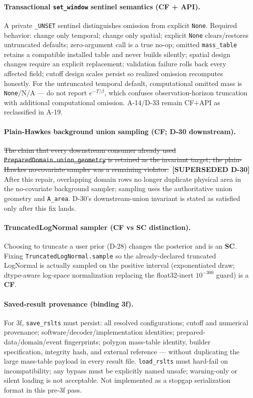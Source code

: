 \documentclass[
  10pt,
]{article}
\newcommand{\amdstrike}[1]{\sout{#1}}
\newcommand{\amdstrike}[1]{\textcolor{supcolor}{#1}}
\newcommand{\supsd}[2]{{\color{supcolor}\amdstrike{#2}}~{\color{amdcolor}\footnotesize\textbf{[SUPERSEDED #1]}}}
\begin{document}
\paragraph{Transactional \texttt{set\_window} sentinel semantics (CF + API).}
A private \texttt{\_UNSET} sentinel distinguishes omission from explicit \texttt{None}.
Required behavior: change only temporal; change only spatial; explicit \texttt{None} clears/restores untruncated defaults; zero-argument call is a true no-op; omitted \texttt{mass\_table} retains a compatible installed table and never builds silently; spatial design changes require an explicit replacement; validation failure rolls back every affected field; cutoff design scales persist so realized omission recomputes honestly.
For the untruncated temporal default, computational omitted mass is \texttt{None}/N/A --- do not report \(e^{-T/\beta}\), which confuses observation-horizon truncation with additional computational omission.
A-14/D-33 remain CF+API as reclassified in A-19.

\paragraph{Plain-Hawkes background union sampling (CF; D-30 downstream).}
\supsd{D-30}{The claim that every downstream consumer already used \texttt{PreparedDomain.union\_geometry} is retained as the invariant target; the plain-Hawkes no-covariate sampler was a remaining violator.}
After this repair, overlapping domain rows no longer duplicate physical area in the no-covariate background sampler; sampling uses the authoritative union geometry and \texttt{A\_area}.
D-30's downstream-union invariant is stated as satisfied only after this fix lands.

\paragraph{TruncatedLogNormal sampler (CF vs SC distinction).}
Choosing to truncate a user prior (D-28) changes the posterior and is an \textbf{SC}.
Fixing \texttt{TruncatedLogNormal.sample} so the already-declared truncated LogNormal is actually sampled on the positive interval (exponentiated draw; dtype-aware log-space normalization replacing the float32-inert \(10^{-300}\) guard) is a \textbf{CF}.

\paragraph{Saved-result provenance (binding 3f).}
For 3f, \texttt{save\_rslts} must persist: all resolved configurations; cutoff and numerical provenance; software/decoder/implementation identities; prepared-data/domain/event fingerprints; polygon mass-table identity, builder specification, integrity hash, and external reference --- without duplicating the large mass-table payload in every result file.
\texttt{load\_rslts} must hard-fail on incompatibility; any bypass must be explicitly named unsafe; warning-only or silent loading is not acceptable.
Not implemented as a stopgap serialization format in this pre-3f pass.
\end{document}
